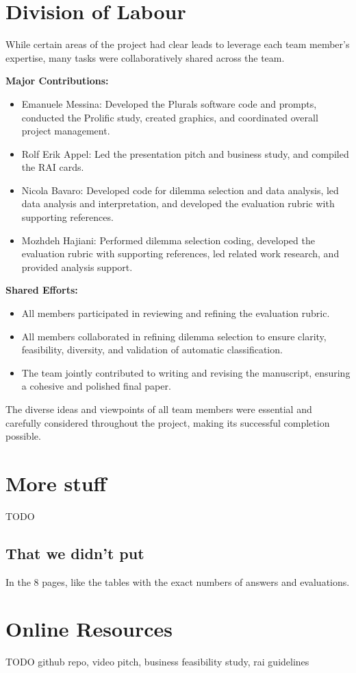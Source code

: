 \documentclass[sigconf, authorversion, nonacm, screen]{acmart}
\begin{document}
\section{Division of Labour}

While certain areas of the project had clear leads to leverage each team member’s expertise, many tasks were collaboratively shared across the team.

\textbf{Major Contributions:}
\begin{itemize}
  \item {Emanuele Messina:} Developed the Plurals software code and prompts, conducted the Prolific study, created graphics, and coordinated overall project management.
  \item {Rolf Erik Appel:} Led the presentation pitch and business study, and compiled the RAI cards.
  \item {Nicola Bavaro:} Developed code for dilemma selection and data analysis, led data analysis and interpretation, and developed the evaluation rubric with supporting references.
  \item {Mozhdeh Hajiani:} Performed dilemma selection coding, developed the evaluation rubric with supporting references, led related work research, and provided analysis support.
\end{itemize}

\textbf{Shared Efforts:}
\begin{itemize}
  \item All members participated in reviewing and refining the evaluation rubric.
  \item All members collaborated in refining dilemma selection to ensure clarity, feasibility, diversity, and validation of automatic classification.
  \item The team jointly contributed to writing and revising the manuscript, ensuring a cohesive and polished final paper.
\end{itemize}

The diverse ideas and viewpoints of all team members were essential and carefully considered throughout the project, making its successful completion possible.

\section{More stuff}

TODO

\subsection{That we didn't put}

In the 8 pages, like the tables with the exact numbers of answers and evaluations.

\section{Online Resources}

TODO
github repo, video pitch, business feasibility study, rai guidelines
\end{document}
